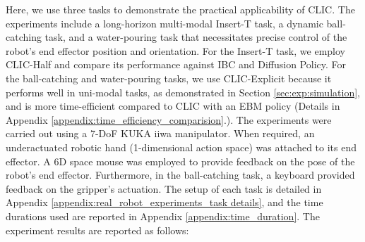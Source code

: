 Here, we use three tasks to demonstrate the practical applicability of CLIC.
The experiments include a long-horizon multi-modal Insert-T task, a dynamic ball-catching task, and a water-pouring task that necessitates precise control of the robot's end effector position and orientation. 
For the Insert-T task, we employ CLIC-Half and compare its performance against IBC and Diffusion Policy.
For the ball-catching and water-pouring tasks, we use CLIC-Explicit because it performs well in uni-modal tasks, as demonstrated in Section \ref{sec:exp:simulation}, and is more time-efficient compared to CLIC with an EBM policy (Details in Appendix \ref{appendix:time_efficiency_comparision}.).
The experiments were carried out using a 7-DoF KUKA iiwa manipulator. When required, an underactuated robotic hand (1-dimensional action space) was attached to its end effector. A 6D space mouse was employed to provide feedback on the pose of the robot's end effector. Furthermore, in the ball-catching task, a keyboard provided feedback on the gripper's actuation. 
The setup of each task is detailed in Appendix \ref{appendix:real_robot_experiments_task details}, and the time durations used are reported in Appendix \ref{appendix:time_duration}. 
The experiment results are reported as follows:




